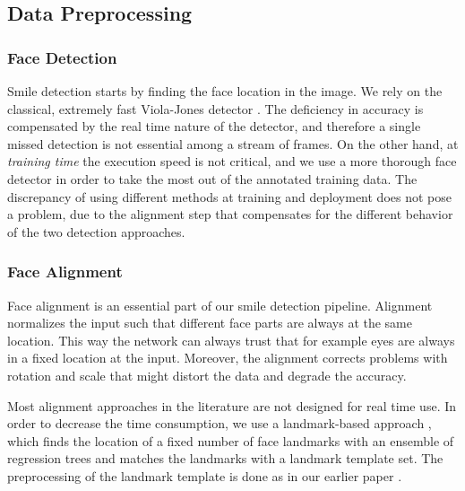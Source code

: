 \documentclass[conference]{IEEEtran}
\begin{document}
\subsection{Data Preprocessing}

\subsubsection{Face Detection}


Smile detection starts by finding the face location in the image. We rely on the classical, extremely fast Viola-Jones detector \cite{viola}. The deficiency in accuracy is compensated by the real time nature of the detector, and therefore a single missed detection is not essential among a stream of frames. On the other hand, at \textit{training time} the execution speed is not critical, and we use a more thorough face detector \cite{headhunter} in order to take the most out of the annotated training data. The discrepancy of using different methods at training and deployment does not pose a problem, due to the alignment step that compensates for the different behavior of the two detection approaches.

\subsubsection{Face Alignment}

Face alignment is an essential part of our smile detection pipeline. Alignment normalizes the input such that different face parts are always at the same location. This way the network can always trust that for example eyes are always in a fixed location at the input. Moreover, the alignment corrects problems with rotation and scale that might distort the data and degrade the accuracy.

Most alignment approaches in the literature are not designed for real time use. In order to decrease the time consumption, we use a landmark-based approach \cite{dlip}, which finds the location of a fixed number of face landmarks with an ensemble of regression trees and matches the landmarks with a landmark  template set. The preprocessing of the landmark template is done as in our earlier paper \cite{bai2018}.
\end{document}
